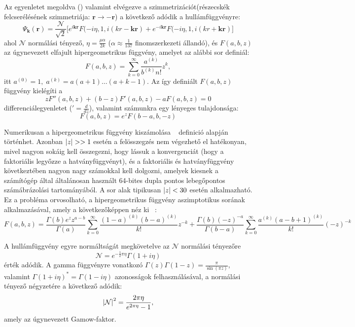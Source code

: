 \documentclass[11pt,a4paper]{article}
\numberwithin{equation}{subsection}
\numberwithin{figure}{section}
\begin{document}
Az egyenletet megoldva (\cite{Landau3}) valamint elvégezve a szimmetrizációt(részecskék felcserélésének szimmetriája: $\bm{r}\rightarrow -\bm{r}$) a következő adódik a hullámfüggvényre:
\begin{equation}
\Psi_{\bm{k}}(\bm{r}) = \frac{\mathcal{N}}{\sqrt{2}}\Big[e^{i\bm{kr}}F(-i\eta, 1, i(kr-\bm{kr})
+e^{-i\bm{kr}}F(-i\eta, 1, i(kr+\bm{kr})\Big]
\end{equation}
ahol $\mathcal{N}$ normálási tényező, $\eta=\frac{\mu\alpha}{2k}$ ($\alpha\approx \frac{1}{137}$ finomszerkezeti állandó), és $F(a,b,z)$ az úgynevezett elfajult hipergeometrikus függvény, amelyet az alábbi sor definiál:
\begin{equation}
F(a,b,z)=\sum_{k=0}^\infty\frac{a^{(k)}}{b^{(k)}n!}z^k,
\label{eq:Fserie}
\end{equation}
itt $a^{(0)}=1,\;a^{(k)}=a(a+1)\dots(a+k-1)$. Az így definiált $F(a,b,z)$ függvény kielégíti a 
\begin{equation}
zF''(a,b,z)+(b-z)F'(a,b,z)-aF(a,b,z)=0
\end{equation}
differenciálegyenletet ($'=\frac{d}{dz}$), valamint számunkra egy lényeges tulajdonsága:
\begin{equation}
F(a,b,z) = e^zF(b-a, b, -z)
\end{equation}

Numerikusan a hipergeometrikus függvény kiszámolása ~ definició alapján történhet. Azonban $\abs{z}>>1$ esetén a felösszegzés nem végezhető el hatékonyan, mivel nagyon sokáig kell összegezni, hogy lássuk a konvergenciát (hogy a faktoriális legyőzze a hatványfüggvényt), és a faktoriális és hatványfüggvény következtében nagyon nagy számokkal kell dolgozni, amelyek kiesnek a számítógép által általánosan használt 64-bites dupla pontos lebegőpontos számábrázolási tartományából. A sor alak tipikusan $\abs{z}<30$ esetén alkalmazható. Ez a probléma orvosolható, a hipergeometrikus függvény aszimptotikus sorának alkalmazásával, amely a következőképpen néz ki ~\cite{NIST:DLMF}:
\begin{equation}
F(a,b,z)=\frac{\Gamma(b)e^zz^{a-b}}{\Gamma(a)}\sum_{k=0}^{\infty}\frac{(1-a)^{(k)}(b-a)^{(k)}}{k!}z^{-k}+\frac{\Gamma(b)(-z)^{-a}}{\Gamma(b-a)}\sum_{k=0}^\infty \frac{a^{(k)}(a-b+1)^{(k)}}{k!}(-z)^{-k}
\end{equation}

A hullámfüggvény egyre normáltságát megkövetelve az $\mathcal{N}$ normálási tényezőre 
\begin{equation}
\mathcal{N}=e^{-\frac{1}{2}\pi\eta}\Gamma(1+i\eta)
\end{equation}
érték adódik. A gamma függvényre vonatkozó $\Gamma(z)\Gamma(1-z)=\frac{\pi}{\sin(\pi z)}$, valamint $\Gamma(1+i\eta)^{*}=\Gamma(1-i\eta)$ azonosságok felhasználásával, a normálási tényező négyzetére a következő adódik:
\begin{equation}
\abs{\mathcal{N}}^2=\frac{2\pi\eta}{e^{2\pi\eta}-1},
\label{eq:Gamow}
\end{equation}
amely az úgynevezett Gamow-faktor.
\end{document}
